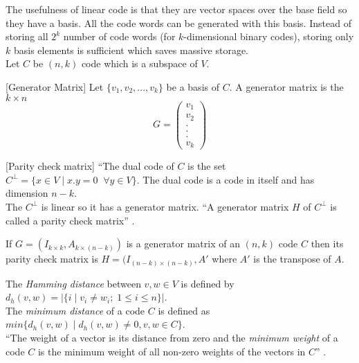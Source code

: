 The usefulness of linear code is that they are vector spaces over the base field so they have a basis. All the code words can be generated with this basis. Instead of storing all \(2^k\) number of code words (for \(k\)-dimensional binary codes), storing only \(k\) basis elements is sufficient which saves massive storage.\\[2mm]
Let \(C\) be \((n,k)\) code which is a subspace of \(V\).

\begin{definition} \cite{error_correct} [Generator Matrix]
  Let \(\{v_1, v_2,...,v_k\}\) be a basis of \(C\). A generator matrix is the \(k \times n\)
  \[G=\begin{pmatrix}
      v_1\\
      v_2\\
      .\\
      .\\
      .\\
      v_k
    \end{pmatrix}
  \]
\end{definition}
\vspace{2mm}

\begin{definition} \cite{error_correct} [Parity check matrix]
  ``The dual code of \(C\) is the set \(C^{\perp}=\{x \in V \;| \; x.y=0 \;\; \forall y \in V \}\). The dual code is a code in itself and has dimension \(n-k\).\\
  The \(C^{\perp}\) is linear so it has a generator matrix. ``A generator matrix \(H\) of \(C^{\perp}\) is called a parity check matrix'' \cite{error_correct}.
\end{definition}

\begin{theorem} \cite{coding}
  If \(G=(I_{k \times k},A_{k \times (n-k)})\) is a generator matrix of an \((n,k)\) code \(C\) then its parity check matrix is \(H=(I_{(n-k) \times (n-k)}, A'\) where \(A'\) is the transpose of \(A\).
\end{theorem}

\begin{definition} \cite{coding}
  The \textit{Hamming distance} between \(v,w \in V\) is defined by \(d_h(v,w)=|\{i\;|\; v_i \neq w_i;\; 1 \leq i \leq n \}|\).\\
  The \textit{minimum distance} of a code \(C\) is defined as \(min\{d_h(v,w)\;|\; d_h(v,w) \neq 0, v,w \in C\}\).\\
  ``The weight of a vector is its distance from zero and the \textit{minimum weight} of a code \(C\) is the minimum weight of all non-zero weights of the vectors in \(C\)'' \cite{error_correct}.
\end{definition}

